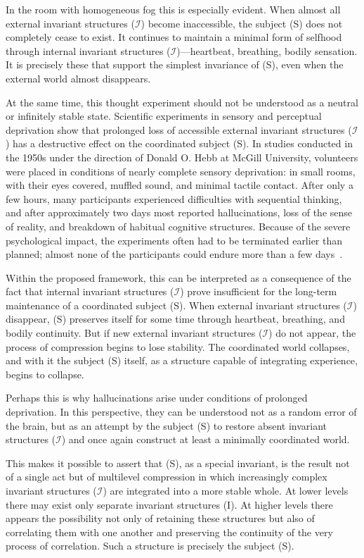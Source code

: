 \documentclass[aps,prd,onecolumn,nofootinbib,superscriptaddress]{revtex4-2}
\begin{document}
In the room with homogeneous fog this is especially evident. When almost all external invariant structures ($\mathcal{I}$) become inaccessible, the subject (S) does not completely cease to exist. It continues to maintain a minimal form of selfhood through internal invariant structures ($\mathcal{I}$)—heartbeat, breathing, bodily sensation. It is precisely these that support the simplest invariance of (S), even when the external world almost disappears.

At the same time, this thought experiment should not be understood as a neutral or infinitely stable state. Scientific experiments in sensory and perceptual deprivation show that prolonged loss of accessible external invariant structures ($\mathcal{I}$) has a destructive effect on the coordinated subject (S). In studies conducted in the 1950s under the direction of Donald O. Hebb at McGill University, volunteers were placed in conditions of nearly complete sensory deprivation: in small rooms, with their eyes covered, muffled sound, and minimal tactile contact. After only a few hours, many participants experienced difficulties with sequential thinking, and after approximately two days most reported hallucinations, loss of the sense of reality, and breakdown of habitual cognitive structures. Because of the severe psychological impact, the experiments often had to be terminated earlier than planned; almost none of the participants could endure more than a few days~\cite{Hebb1958}.

Within the proposed framework, this can be interpreted as a consequence of the fact that internal invariant structures ($\mathcal{I}$) prove insufficient for the long-term maintenance of a coordinated subject (S). When external invariant structures ($\mathcal{I}$) disappear, (S) preserves itself for some time through heartbeat, breathing, and bodily continuity. But if new external invariant structures ($\mathcal{I}$) do not appear, the process of compression begins to lose stability. The coordinated world collapses, and with it the subject (S) itself, as a structure capable of integrating experience, begins to collapse.

Perhaps this is why hallucinations arise under conditions of prolonged deprivation. In this perspective, they can be understood not as a random error of the brain, but as an attempt by the subject (S) to restore absent invariant structures ($\mathcal{I}$) and once again construct at least a minimally coordinated world.

This makes it possible to assert that (S), as a special invariant, is the result not of a single act but of multilevel compression in which increasingly complex invariant structures ($\mathcal{I}$) are integrated into a more stable whole. At lower levels there may exist only separate invariant structures (I). At higher levels there appears the possibility not only of retaining these structures but also of correlating them with one another and preserving the continuity of the very process of correlation. Such a structure is precisely the subject (S).
\end{document}
